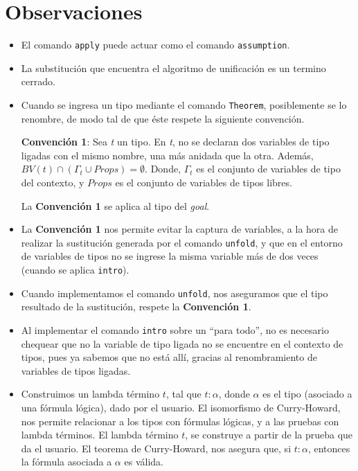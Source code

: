 \documentclass[a4paper,11pt]{article}
\theoremstyle{definition}
\begin{document}
\section{Observaciones}
\begin{itemize}
  \item El comando \texttt{apply} puede actuar como el comando \texttt{assumption}.

  \item La substitución que encuentra el algoritmo de unificación es un termino cerrado.
  
  \item Cuando se ingresa un tipo mediante el comando \texttt{Theorem}, posiblemente se lo renombre, de modo tal de que éste respete la siguiente
  convención.
  
  \textbf{Convención 1}: Sea \textit{t} un tipo. 
  En \textit{t}, no se declaran dos variables de tipo ligadas con el mismo nombre, una más anidada que la otra.
  Además, $BV (t) \cap (\Gamma_{t} \cup Props) = \emptyset$. Donde, $\Gamma_{t}$ es el conjunto de variables de tipo del contexto, y $Props$ es el conjunto
  de variables de tipos libres.
  
  La \textbf{Convención 1} se aplica al tipo del \textit{goal}.
  
  \item La \textbf{Convención 1} nos permite evitar la captura de variables, a la hora de realizar la sustitución generada por el comando \texttt{unfold},
  y que en el entorno de variables de tipos no se ingrese la misma variable más de dos veces (cuando se aplica \texttt{intro}).
 
  \item Cuando implementamos el comando \texttt{unfold}, nos aseguramos que el tipo resultado de la sustitución, respete la \textbf{Convención 1}.
  
  \item Al implementar el comando \texttt{intro} sobre un ``para todo'', no es necesario chequear que no la variable de tipo ligada no se encuentre
  en el contexto de tipos, pues ya sabemos que no está allí, gracias al renombramiento de variables de tipos ligadas.
  
  \item Construimos un lambda término $t$, tal que $t:\alpha$, donde $\alpha$ es el tipo (asociado a una fórmula lógica), dado por el usuario. El isomorfismo
  de Curry-Howard, nos permite relacionar a los tipos con fórmulas lógicas, y a las pruebas con lambda términos.
  El lambda término $t$, se construye a partir de la prueba que da el usuario.
  El teorema de Curry-Howard, nos asegura que, si $t:\alpha$, entonces la fórmula asociada a $\alpha$ es válida.
  

\end{itemize}
\end{document}
